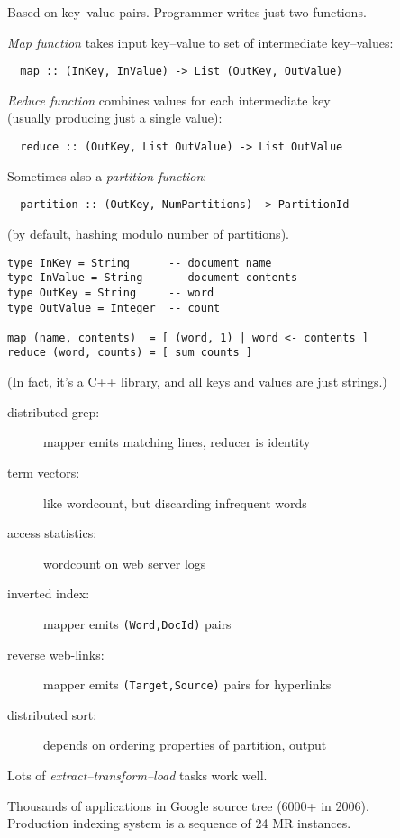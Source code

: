 \documentclass{sepslide-soa}
\begin{document}
\begin{slide}
Based on key--value pairs.
Programmer writes just two functions.

\emph{Map function} takes input key--value to set of intermediate key--values:
\begin{verbatim}
  map :: (InKey, InValue) -> List (OutKey, OutValue)
\end{verbatim}

\emph{Reduce function} combines values for each intermediate key \\ (usually producing just a single value):
\begin{verbatim}
  reduce :: (OutKey, List OutValue) -> List OutValue
\end{verbatim}

Sometimes also a \emph{partition function}:
\begin{verbatim}
  partition :: (OutKey, NumPartitions) -> PartitionId
\end{verbatim}
(by default, hashing modulo number of partitions).
\end{slide}

\begin{slide}
\begin{verbatim}
type InKey = String      -- document name
type InValue = String    -- document contents
type OutKey = String     -- word
type OutValue = Integer  -- count

map (name, contents)  = [ (word, 1) | word <- contents ]
reduce (word, counts) = [ sum counts ]
\end{verbatim}
(In fact, it's a C++ library, and all keys and values are just strings.)
\end{slide}

\begin{slide}
\begin{description}
\item[distributed grep:] mapper emits matching lines, reducer is identity
\item[term vectors:] like wordcount, but discarding infrequent words
\item[access statistics:] wordcount on web server logs
\item[inverted index:] mapper emits \verb"(Word,DocId)" pairs
\item[reverse web-links:] mapper emits \verb"(Target,Source)" pairs for hyperlinks
\item[distributed sort:] depends on ordering properties of partition, output
\end{description}
Lots of \emph{extract--transform--load} tasks work well.

Thousands of applications in Google source tree (6000+ in 2006). \\
Production indexing system is a sequence of 24 MR instances.
\end{slide}
\end{document}
